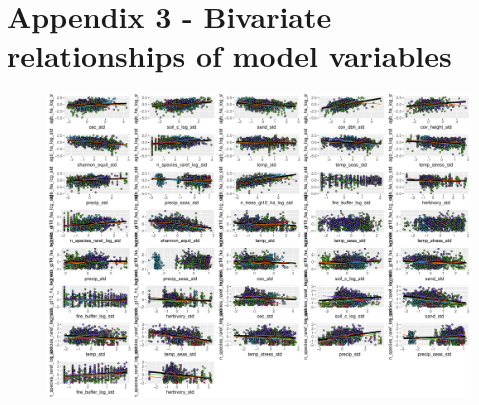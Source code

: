 \documentclass[11pt,a4paper]{article}
\begin{document}



\section{Appendix 3 - Bivariate relationships of model variables} \label{appendixc}

\begin{figure}[H]
\centering
	\includegraphics[width=\textwidth]{bivar_lm}
	\caption{}
	\label{bivar_lm}
\end{figure}
\end{document}
